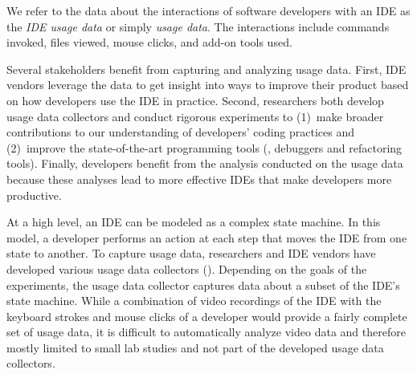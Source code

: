 We refer to the data about the interactions of software developers with an IDE as the
\emph{IDE usage data} or simply \emph{usage data}.  The interactions include commands invoked, files viewed, mouse clicks, and add-on tools used.

%
Several stakeholders benefit from capturing and analyzing usage data. First, IDE
vendors leverage the data to get insight into ways to improve their product
based on how developers use the IDE in practice. Second, researchers both
develop usage data collectors and conduct rigorous experiments to (1)~make
broader contributions to our understanding of developers' coding practices and
(2)~improve the state-of-the-art programming tools (\eg, debuggers and
refactoring tools). Finally, developers benefit from the analysis conducted on
the usage data because these analyses lead to more effective IDEs that make
developers more productive.

At a high level, an IDE can be modeled as a complex state machine. In this
model, a developer performs an action at each step that moves the IDE from one state
to another.
To capture usage data, researchers and IDE vendors have
developed various usage data collectors ().
Depending on the goals of the experiments, the usage data collector captures
data about a subset of the IDE's state machine. While a combination of video recordings of the IDE with the keyboard strokes and mouse clicks of a developer would provide a fairly complete set of usage data, it is difficult to automatically analyze video data and therefore mostly limited to small lab studies and not part of the developed usage data collectors.



